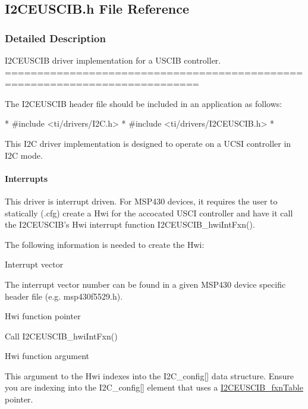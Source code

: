 \subsection{I2\-C\-E\-U\-S\-C\-I\-B.\-h File Reference}
\label{_i2_c_e_u_s_c_i_b_8h}


\subsubsection{Detailed Description}
I2\-C\-E\-U\-S\-C\-I\-B driver implementation for a U\-S\-C\-I\-B controller. ============================================================================

The I2\-C\-E\-U\-S\-C\-I\-B header file should be included in an application as follows\-: 
\begin{DoxyCode}
*  #include <ti/drivers/I2C.h>
*  #include <ti/drivers/I2CEUSCIB.h>
*  
\end{DoxyCode}


This I2\-C driver implementation is designed to operate on a U\-C\-S\-I controller in I2\-C mode.

\paragraph*{Interrupts}

This driver is interrupt driven. For M\-S\-P430 devices, it requires the user to statically (.cfg) create a Hwi for the accocated U\-S\-C\-I controller and have it call the I2\-C\-E\-U\-S\-C\-I\-B's Hwi interrupt function I2\-C\-E\-U\-S\-C\-I\-B\-\_\-hwi\-Int\-Fxn().

The following information is needed to create the Hwi\-:
\begin{DoxyEnumerate}
\item Interrupt vector\par
 The interrupt vector number can be found in a given M\-S\-P430 device specific header file (e.\-g. msp430f5529.\-h).
\item Hwi function pointer\par
 Call I2\-C\-E\-U\-S\-C\-I\-B\-\_\-hwi\-Int\-Fxn()
\item Hwi function argument\par
 This argument to the Hwi indexes into the I2\-C\-\_\-config\mbox{[}\mbox{]} data structure. Ensure you are indexing into the I2\-C\-\_\-config\mbox{[}\mbox{]} element that uses a \hyperlink{_i2_c_e_u_s_c_i_b_8h_aabe3af9e77a2b8cc7cd82dd22618e406}{I2\-C\-E\-U\-S\-C\-I\-B\-\_\-fxn\-Table} pointer.
\end{DoxyEnumerate}


